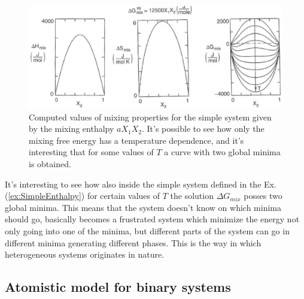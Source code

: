 \begin{figure}[t]
    \centering
    \includegraphics[width=\textwidth]{Immagini/SimpleRegularSolution.png}
    \caption{
        Computed values of mixing properties for the simple system given by the mixing enthalpy $aX_1X_2$. It's possible to see how only the mixing free energy has a temperature dependence, and it's interesting that for some values of $T$ a curve with two global minima is obtained. 
    }
    \label{fig:SimpleRegularSolution}
\end{figure}

\nt
{
    It's interesting to see how also inside the simple system defined in the Ex. (\ref{ex:SimpleEnthalpy}) for certain values of $T$ the solution $\Delta G_{mix}$ posses two global minima. This means that the system doesn't know on which minima should go, basically becomes a frustrated system which minimize the energy not only going into one of the minima, but different parts of the system can go in different minima generating different phases. This is the way in which heterogeneous systems originates in nature. 
}

\subsection{Atomistic model for binary systems}

